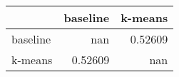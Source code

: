 \begin{tabular}{lrr}
\toprule
          &   baseline &   k-means \\
\midrule
 baseline &  nan       &   0.52609 \\
 k-means  &    0.52609 & nan       \\
\bottomrule
\end{tabular}